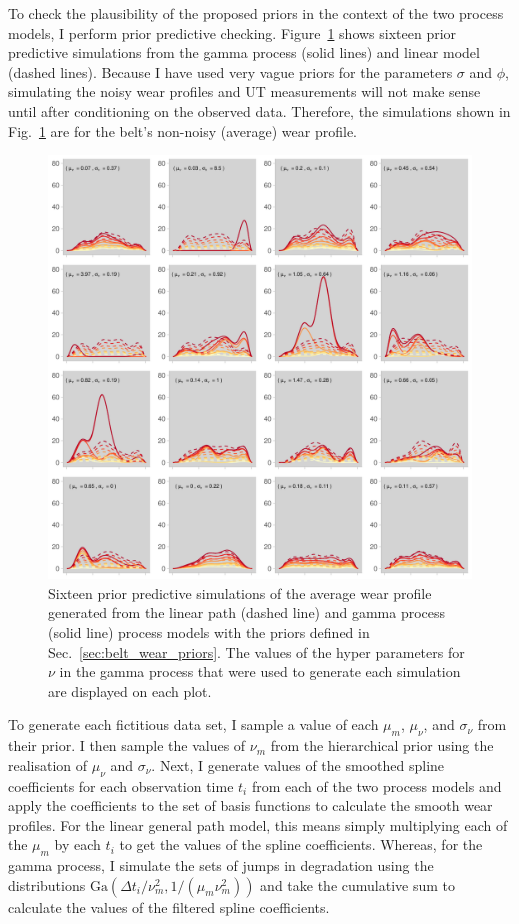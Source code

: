 To check the plausibility of the proposed priors in the context of the two process models, I perform prior predictive checking. Figure~\ref{fig:prior-pc-beltwear} shows sixteen prior predictive simulations from the gamma process (solid lines) and linear model (dashed lines). Because I have used very vague priors for the parameters $\sigma$ and $\phi$, simulating the noisy wear profiles and UT measurements will not make sense until after conditioning on the observed data. Therefore, the simulations shown in Fig.~\ref{fig:prior-pc-beltwear} are for the belt's non-noisy (average) wear profile.

\begin{figure}
  \centering
  \includegraphics[width=\textwidth]{figures/ch-6/prior-pc.pdf}
  \caption{Sixteen prior predictive simulations of the average wear profile generated from the linear path (dashed line) and gamma process (solid line) process models with the priors defined in Sec.~\ref{sec:belt_wear_priors}. The values of the hyper parameters for $\nu$ in the gamma process that were used to generate each simulation are displayed on each plot.}
  \label{fig:prior-pc-beltwear}
\end{figure}

To generate each fictitious data set, I sample a value of each $\mu_m$, $\mu_\nu$, and $\sigma_\nu$ from their prior. I then sample the values of $\nu_m$ from the hierarchical prior using the realisation of $\mu_\nu$ and $\sigma_\nu$. Next, I generate values of the smoothed spline coefficients for each observation time $t_i$ from each of the two process models and apply the coefficients to the set of basis functions to calculate the smooth wear profiles. For the linear general path model, this means simply multiplying each of the $\mu_m$ by each $t_i$ to get the values of the spline coefficients. Whereas, for the gamma process, I simulate the sets of jumps in degradation using the distributions $\mbox{Ga}(\Delta t_i/\nu_m^2, 1 / (\mu_m \nu_m^2))$ and take the cumulative sum to calculate the values of the filtered spline coefficients.

